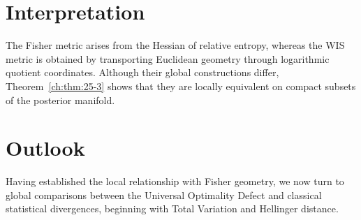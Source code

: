 \section{Interpretation}
The Fisher metric arises from the Hessian of relative entropy, whereas
the WIS metric is obtained by transporting Euclidean geometry through
logarithmic quotient coordinates.
Although their global constructions differ, Theorem~\ref{ch:thm:25-3} shows that they
are locally equivalent on compact subsets of the posterior manifold.
\section{Outlook}
Having established the local relationship with Fisher geometry, we now
turn to global comparisons between the Universal Optimality Defect and
classical statistical divergences, beginning with Total Variation and
Hellinger distance.
